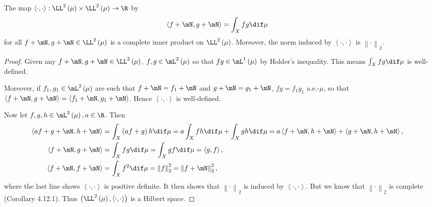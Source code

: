 \documentclass[pmath450]{subfiles}
\begin{document}
    \begin{prop}{}
        The map $\left\langle \cdot, \cdot\right\rangle:\LL^2\left( \mu \right)\times\LL^2\left( \mu \right)\to\R$ by
        \begin{equation*}
            \left\langle f+\mN, g+\mN\right\rangle = \int^{}_{X}fg\dif\mu
        \end{equation*}
        for all $f+\mN,g+\mN\in\LL^{2}\left( \mu \right)$ is a complete inner product on $\LL^{2}\left( \mu \right)$. Moreover, the norm induced by $\left\langle \cdot, \cdot\right\rangle$ is $\left\lVert \cdot\right\rVert_2$.
    \end{prop}

    \begin{proof}
        Given any $f+\mN,g+\mN\in\LL^{2}\left( \mu \right)$, $f,g\in\mL^{2}\left( \mu \right)$ so that $fg\in\lone\left( \mu \right)$ by Holder's inequality. This means $\int_Xfg\dif\mu$ is well-defined.

        Moreover, if $f_1,g_1\in\mL^{2}\left( \mu \right)$ are such that $f+\mN=f_1+\mN$ and $g+\mN=g_1+\mN$, $fg=f_1g_1$ a.e.-$\mu$, so that $\left\langle f+\mN, g+\mN\right\rangle = \left\langle f_1+\mN, g_1+\mN\right\rangle$. Hence $\left\langle \cdot, \cdot\right\rangle$ is well-defined.

        Now let $f,g,h\in\mL^{2}\left( \mu \right), a\in\R$. Then
        \begin{equation*}
            \begin{aligned}
                \left\langle af+g+\mN, h+\mN\right\rangle & = \int_X\left( af+g \right)h\dif\mu = a\int_Xfh\dif\mu+\int_Xgh\dif\mu = a\left\langle f+\mN, h+\mN\right\rangle+\left\langle g+\mN, h+\mN\right\rangle, \\
                \left\langle f+\mN, g+\mN\right\rangle & = \int^{}_{X}fg\dif\mu = \int^{}_{X}gf\dif\mu = \left\langle g, f\right\rangle, \\
                \left\langle f+\mN, f+\mN\right\rangle & = \int^{}_{X}f^{2}\dif\mu = \left\lVert f \right\rVert_{2}^{2} = \left\lVert f+\mN\right\rVert_2^{2},
            \end{aligned} 
        \end{equation*}
        where the last line shows $\left\langle \cdot, \cdot\right\rangle$ is positive definite. It then shows that $\left\lVert \cdot \right\rVert_{2}$ is induced by $\left\langle \cdot, \cdot\right\rangle$. But we know that $\left\lVert \cdot \right\rVert_{2}$ is complete (Corollary 4.12.1). Thus $\left( \LL^{2}\left( \mu \right),\left\langle \cdot, \cdot\right\rangle \right)$ is a Hilbert space.
    \end{proof}
\end{document}
